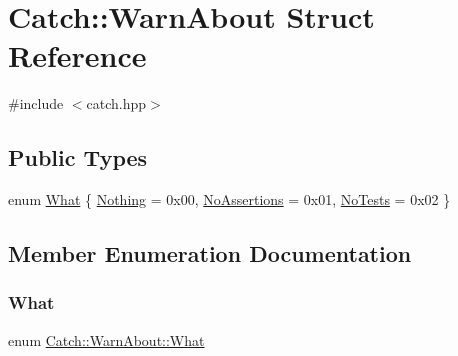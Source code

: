 \hypertarget{struct_catch_1_1_warn_about}{}\section{Catch\+:\+:Warn\+About Struct Reference}
\label{struct_catch_1_1_warn_about}


{\ttfamily \#include $<$catch.\+hpp$>$}

\subsection*{Public Types}
\begin{DoxyCompactItemize}
\item 
enum \mbox{\hyperlink{struct_catch_1_1_warn_about_ae3dde70ef78d700ea896eb29314e0fa3}{What}} \{ \mbox{\hyperlink{struct_catch_1_1_warn_about_ae3dde70ef78d700ea896eb29314e0fa3a9ac33f9211280cca9082557329706d27}{Nothing}} = 0x00, 
\mbox{\hyperlink{struct_catch_1_1_warn_about_ae3dde70ef78d700ea896eb29314e0fa3a516a40a437d6ff29898e2fa93bca8f82}{No\+Assertions}} = 0x01, 
\mbox{\hyperlink{struct_catch_1_1_warn_about_ae3dde70ef78d700ea896eb29314e0fa3ab449dacc48055ee886a4a7aa283db556}{No\+Tests}} = 0x02
 \}
\end{DoxyCompactItemize}


\subsection{Member Enumeration Documentation}
\mbox{\label{struct_catch_1_1_warn_about_ae3dde70ef78d700ea896eb29314e0fa3}} 
\subsubsection{\texorpdfstring{What}{What}}
{\footnotesize\ttfamily enum \mbox{\hyperlink{struct_catch_1_1_warn_about_ae3dde70ef78d700ea896eb29314e0fa3}{Catch\+::\+Warn\+About\+::\+What}}}

